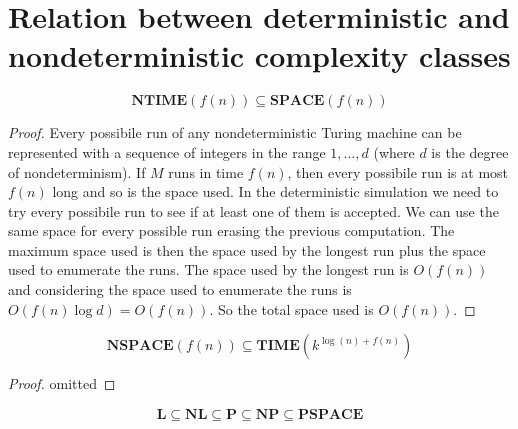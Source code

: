 \documentclass[12pt]{article}
\begin{document}
\section{Relation between deterministic and nondeterministic complexity classes}
\begin{defbox}
  $$\textbf{NTIME}(f(n))\subseteq\textbf{SPACE}(f(n))$$
\end{defbox}
\begin{proof}
  Every possibile run of any nondeterministic Turing machine can be represented with a sequence of integers in the range $1,\ldots,d$ (where $d$ is the degree of nondeterminism). If $M$ runs in time $f(n)$, then every possibile run is at most $f(n)$ long and so is the space used. In the deterministic simulation we need to try every possibile run to see if at least one of them is accepted. We can use the same space for every possible run erasing the previous computation. The maximum space used is then the space used by the longest run plus the space used to enumerate the runs. The space used by the longest run is $O(f(n))$ and considering the space used to enumerate the runs is $O(f(n)\log d)=O(f(n))$.
  So the total space used is $O(f(n))$.
\end{proof}

\begin{defbox}
$$\textbf{NSPACE}(f(n))\subseteq\textbf{TIME}(k^{\log(n)+f(n)})$$  
\end{defbox}
\begin{proof}
  omitted
\end{proof}
\begin{defbox}[Corollary]
  $$\textbf{L}\subseteq\textbf{NL}\subseteq\textbf{P}\subseteq\textbf{NP}\subseteq\textbf{PSPACE}$$
  
\end{defbox}
\end{document}

